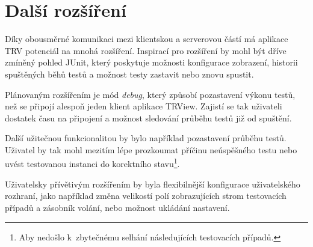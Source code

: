   \section{Další rozšíření}
  Díky obousměrné komunikaci mezi klientskou a serverovou částí má aplikace TRV potenciál na mnohá rozšíření. Inspirací pro rozšíření by mohl být dříve zmíněný pohled JUnit, který poskytuje možnosti konfigurace zobrazení, historii spuštěných běhů testů a možnost testy zastavit nebo znovu spustit.

  Plánovaným rozšířením je mód \emph{debug}, který způsobí pozastavení výkonu testů, než se připojí alespoň jeden klient aplikace TRView. Zajistí se tak uživateli dostatek času na připojení a možnost sledování průběhu testů již od spuštění.

  Další užitečnou funkcionalitou by bylo například pozastavení průběhu testů. Uživatel by tak mohl mezitím lépe prozkoumat příčinu neúspěšného testu nebo uvést testovanou instanci do korektního stavu\footnote{Aby nedošlo k~zbytečnému selhání následujících testovacích případů.}.

  Uživatelsky přívětivým rozšířením by byla flexibilnější konfigurace uživatelského rozhraní, jako například změna velikostí polí zobrazujících strom testovacích případů a zásobník volání, nebo možnost ukládání nastavení.
